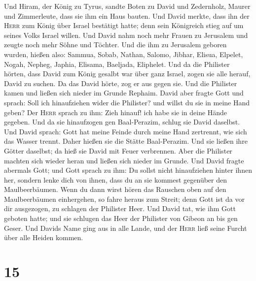  Und Hiram, der König zu Tyrus, sandte Boten zu David und
Zedernholz, Maurer und Zimmerleute, dass sie ihm ein Haus bauten.
 Und David merkte, dass ihn der \textsc{Herr} zum König
über Israel bestätigt hatte; denn sein Königreich stieg auf um seines
Volks Israel willen.  Und David nahm noch mehr Frauen zu
Jerusalem und zeugte noch mehr Söhne und Töchter.  Und die
ihm zu Jerusalem geboren wurden, hießen also: Sammua, Sobab, Nathan,
Salomo,  Jibhar, Elisua, Elpelet,  Nogah,
Nepheg, Japhia,  Elisama, Baeljada, Eliphelet.
 Und da die Philister hörten, dass David zum König gesalbt
war über ganz Israel, zogen sie alle herauf, David zu suchen. Da das
David hörte, zog er aus gegen sie.  Und die Philister
kamen und ließen sich nieder im Grunde Rephaim.  David
aber fragte Gott und sprach: Soll ich hinaufziehen wider die Philister?
und willst du sie in meine Hand geben? Der \textsc{Herr} sprach zu ihm:
Zieh hinauf! ich habe sie in deine Hände gegeben.  Und da
sie hinaufzogen gen Baal-Perazim, schlug sie David daselbst. Und David
sprach: Gott hat meine Feinde durch meine Hand zertrennt, wie sich das
Wasser trennt. Daher hießen sie die Stätte Baal-Perazim. 
Und sie ließen ihre Götter daselbst; da hieß sie David mit Feuer
verbrennen.  Aber die Philister machten sich wieder heran
und ließen sich nieder im Grunde.  Und David fragte
abermals Gott; und Gott sprach zu ihm: Du sollst nicht hinaufziehen
hinter ihnen her, sondern lenke dich von ihnen, dass du an sie kommest
gegenüber den Maulbeerbäumen.  Wenn du dann wirst hören
das Rauschen oben auf den Maulbeerbäumen einhergehen, so fahre heraus
zum Streit; denn Gott ist da vor dir ausgezogen, zu schlagen der
Philister Heer.  Und David tat, wie ihm Gott geboten
hatte; und sie schlugen das Heer der Philister von Gibeon an bis gen
Geser.  Und Davids Name ging aus in alle Lande, und der
\textsc{Herr} ließ seine Furcht über alle Heiden kommen.

\hypertarget{section-14}{%
\section{15}\label{section-14}}

